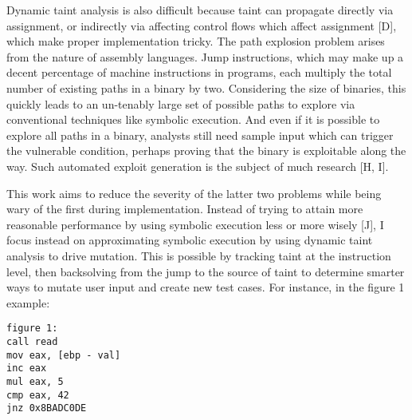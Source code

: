 \documentclass[11pt,expanded,copyright]{fsuthesis}
\begin{document}
 
 Dynamic taint analysis is also difficult because taint can propagate directly via assignment, or indirectly via affecting control flows which affect assignment [D], which make proper implementation tricky. The path explosion problem arises from the nature of assembly languages. Jump instructions, which may make up a decent percentage of machine instructions in programs, each multiply the total number of existing paths in a binary by two. Considering the size of binaries, this quickly leads to an un-tenably large set of possible paths to explore via conventional techniques like symbolic execution. And even if it is possible to explore all paths in a binary, analysts still need sample input which can trigger the vulnerable condition, perhaps proving that the binary is exploitable along the way. Such automated exploit generation is the subject of much research [H, I].

This work aims to reduce the severity of the latter two problems while being wary of the first during implementation. Instead of trying to attain more reasonable performance by using symbolic execution less or more wisely [J], I focus instead on approximating symbolic execution by using dynamic taint analysis to drive mutation. This is possible by tracking taint at the instruction level, then backsolving from the jump to the source of taint to determine smarter ways to mutate user input and create new test cases. For instance, in the figure 1 example:
\\

\begin{verbatim}
figure 1:
call read
mov eax, [ebp - val]
inc eax
mul eax, 5
cmp eax, 42
jnz 0x8BADC0DE
\end{verbatim}
\end{document}
